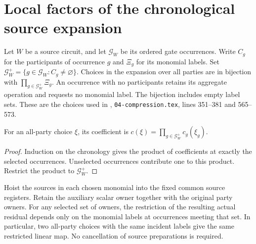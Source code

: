 \section{Local factors of the chronological source expansion}
\label{sec:peps_chronological_local_factors}

\begin{definition}
    \label{def:peps_nonempty_gate_labels}
    \leanok
    Let $W$ be a source circuit, and let $\mathcal G_W$ be its ordered
    gate occurrences. Write $C_g$ for the participants of occurrence $g$
    and $\Xi_g$ for its monomial labels. Set
    $\mathcal G_W^+=\{g\in\mathcal G_W:C_g\ne\varnothing\}$.
    Choices in the expansion over all parties are in bijection with
    $\prod_{g\in\mathcal G_W^+}\Xi_g$.
    An occurrence with no participants retains its aggregate operation
    and requests no monomial label. The bijection includes empty label
    sets. These are the choices used in
    \cite[proof of Theorem~5.2]{OpenAI2026PolynomialPEPS},
    \texttt{04-compression.tex}, lines 351--381 and 565--573.
\end{definition}

\begin{theorem}
    \label{thm:peps_chronological_coefficients}
    \leanok
    For an all-party choice $\xi$, its coefficient is
    $c(\xi)=\prod_{g\in\mathcal G_W^+}c_g(\xi_g)$.
\end{theorem}

\begin{proof}\leanok
    Induction on the chronology gives the product of coefficients at
    exactly the selected occurrences. Unselected occurrences contribute
    one to this product. Restrict the product to $\mathcal G_W^+$.
\end{proof}

\begin{theorem}
    \label{thm:peps_incident_residual}
    \leanok
    Hoist the sources in each chosen monomial into the fixed common
    source registers. Retain the auxiliary scalar owner together with
    the original party owners. For any selected set of owners, the
    restriction of the resulting actual residual depends only on the
    monomial labels at occurrences meeting that set.
    In particular, two all-party choices with the same incident labels
    give the same restricted linear map. No cancellation of source
    preparations is required.
\end{theorem}

